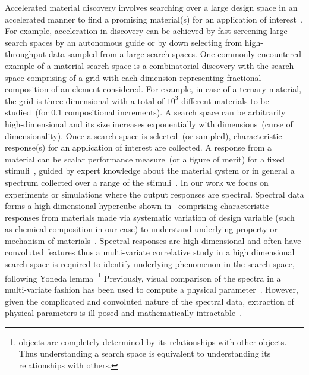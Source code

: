Accelerated material discovery involves searching over a large design space in an accelerated manner to find a promising material(s) for an application of interest~\cite{rajan2013informatics,ajayi2016rapid}. For example, acceleration in discovery can be achieved by fast screening large search spaces by an autonomous guide or by down selecting from high-throughput data sampled from a large search spaces. One commonly encountered example of a material search space is a combinatorial discovery with the search space comprising of a grid with each dimension representing fractional composition of an element considered. For example, in case of a ternary material, the grid is three dimensional with a total of \(10^3\) different materials to be studied~(for \(0.1\) compositional increments). A search space can be arbitrarily high-dimensional and its size increases exponentially with dimensions~(curse of dimensionality). Once a search space is selected~(or sampled), characteristic response(s) for an application of interest are collected. A response from a material can be scalar performance measure~(or a figure of merit) for a fixed stimuli~\cite{haber2014high,suram2015generating}, guided by expert knowledge about the material system or in general a spectrum collected over a range of the stimuli~\cite{hattrick2016perspective}. In our work we focus on experiments or simulations where the output responses are spectral.
Spectral data forms a high-dimensional hypercube shown in~ comprising characteristic responses from materials made via systematic variation of design variable (such as chemical composition in our case) to understand underlying property or mechanism of materials~\cite{rajan2013informatics}.
Spectral responses are high dimensional and often have convoluted features thus a multi-variate correlative study in a high dimensional search space is required to identify underlying phenomenon in the search space, following Yoneda lemma~\footnote{objects are completely determined by its relationships with other objects. Thus understanding a search space is equivalent to understanding its relationships with others.} Previously, visual comparison of the spectra in a multi-variate fashion has been used to compute a physical parameter~\cite{de2008core,de19902p}. However, given the complicated and convoluted nature of the spectral data, extraction of physical parameters is ill-posed and mathematically intractable~\cite{suzuki2019automated}. 

